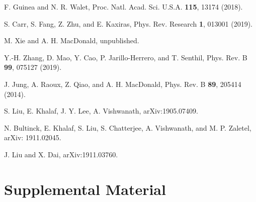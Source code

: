 \documentclass[aps,prl,reprint,amssymb,groupedaddress,twocolumn]{revtex4}
\begin{document}
\begin{thebibliography}{99}
	F. Guinea and N. R. Walet, 
	Proc. Natl. Acad. Sci. U.S.A. \textbf{115}, 13174 (2018).
	
	S. Carr, S. Fang, Z. Zhu, and E. Kaxiras,
	Phys. Rev. Research \textbf{1}, 013001 (2019).
	
	
	 M. Xie and A. H. MacDonald, unpublished.
	
	Y.-H. Zhang, D. Mao, Y. Cao, P. Jarillo-Herrero, and T. Senthil, 
	Phys. Rev. B \textbf{99}, 075127 (2019).
	
	J. Jung, A. Raoux, Z. Qiao, and A. H. MacDonald, 
	Phys. Rev. B \textbf{89}, 205414 (2014).
	
	
	S. Liu, E. Khalaf, J. Y. Lee, A. Vishwanath, 
	arXiv:1905.07409.
	
	N. Bultinck, E. Khalaf, S. Liu, S. Chatterjee, A. Vishwanath, and M. P. Zaletel, 
	arXiv: 1911.02045.
	
	J. Liu and X. Dai, arXiv:1911.03760.
	
	
\end{thebibliography}

\newpage
\appendix

\section{Supplemental Material}
\renewcommand\thefigure{S\arabic{figure}}
\setcounter{figure}{0}
\renewcommand\theequation{S\arabic{equation}}
\setcounter{equation}{0}
\end{document}
